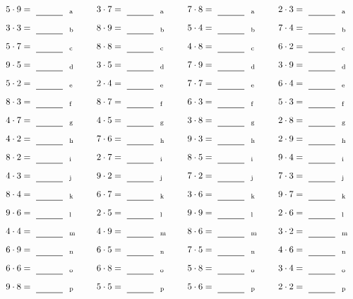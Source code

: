 \documentclass
[
  draft    = true,
  fontsize = 11pt,
  parskip  = half-
]
{scrartcl}
\begin{document}
\par\vfill\par
\begin{align*}
    \pline{5\cdot9}&=\rline{a}
  & \pline{3\cdot7}&=\rline{a}
  & \pline{7\cdot8}&=\rline{a}
  & \pline{2\cdot3}&=\rline{a} \\[1ex]
    \pline{3\cdot3}&=\rline{b}
  & \pline{8\cdot9}&=\rline{b}
  & \pline{5\cdot4}&=\rline{b}
  & \pline{7\cdot4}&=\rline{b} \\[1ex]
    \pline{5\cdot7}&=\rline{c}
  & \pline{8\cdot8}&=\rline{c}
  & \pline{4\cdot8}&=\rline{c}
  & \pline{6\cdot2}&=\rline{c} \\[1ex]
    \pline{9\cdot5}&=\rline{d}
  & \pline{3\cdot5}&=\rline{d}
  & \pline{7\cdot9}&=\rline{d}
  & \pline{3\cdot9}&=\rline{d} \\[1ex]
    \pline{5\cdot2}&=\rline{e}
  & \pline{2\cdot4}&=\rline{e}
  & \pline{7\cdot7}&=\rline{e}
  & \pline{6\cdot4}&=\rline{e} \\[1ex]
    \pline{8\cdot3}&=\rline{f}
  & \pline{8\cdot7}&=\rline{f}
  & \pline{6\cdot3}&=\rline{f}
  & \pline{5\cdot3}&=\rline{f} \\[1ex]
    \pline{4\cdot7}&=\rline{g}
  & \pline{4\cdot5}&=\rline{g}
  & \pline{3\cdot8}&=\rline{g}
  & \pline{2\cdot8}&=\rline{g} \\[1ex]
    \pline{4\cdot2}&=\rline{h}
  & \pline{7\cdot6}&=\rline{h}
  & \pline{9\cdot3}&=\rline{h}
  & \pline{2\cdot9}&=\rline{h} \\[1ex]
    \pline{8\cdot2}&=\rline{i}
  & \pline{2\cdot7}&=\rline{i}
  & \pline{8\cdot5}&=\rline{i}
  & \pline{9\cdot4}&=\rline{i} \\[1ex]
    \pline{4\cdot3}&=\rline{j}
  & \pline{9\cdot2}&=\rline{j}
  & \pline{7\cdot2}&=\rline{j}
  & \pline{7\cdot3}&=\rline{j} \\[1ex]
    \pline{8\cdot4}&=\rline{k}
  & \pline{6\cdot7}&=\rline{k}
  & \pline{3\cdot6}&=\rline{k}
  & \pline{9\cdot7}&=\rline{k} \\[1ex]
    \pline{9\cdot6}&=\rline{l}
  & \pline{2\cdot5}&=\rline{l}
  & \pline{9\cdot9}&=\rline{l}
  & \pline{2\cdot6}&=\rline{l} \\[1ex]
    \pline{4\cdot4}&=\rline{m}
  & \pline{4\cdot9}&=\rline{m}
  & \pline{8\cdot6}&=\rline{m}
  & \pline{3\cdot2}&=\rline{m} \\[1ex]
    \pline{6\cdot9}&=\rline{n}
  & \pline{6\cdot5}&=\rline{n}
  & \pline{7\cdot5}&=\rline{n}
  & \pline{4\cdot6}&=\rline{n} \\[1ex]
    \pline{6\cdot6}&=\rline{o}
  & \pline{6\cdot8}&=\rline{o}
  & \pline{5\cdot8}&=\rline{o}
  & \pline{3\cdot4}&=\rline{o} \\[1ex]
    \pline{9\cdot8}&=\rline{p}
  & \pline{5\cdot5}&=\rline{p}
  & \pline{5\cdot6}&=\rline{p}
  & \pline{2\cdot2}&=\rline{p}
\end{align*}
\end{document}
